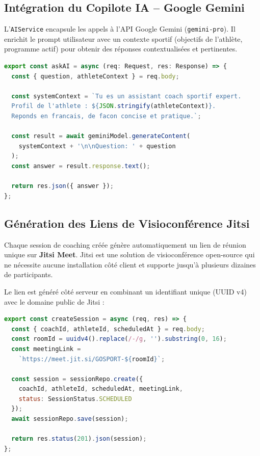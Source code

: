 \subsection{Intégration du Copilote IA -- Google Gemini}
L'\texttt{AIService} encapsule les appels à l'API Google Gemini (\texttt{gemini-pro}). Il enrichit le prompt utilisateur avec un contexte sportif (objectifs de l'athlète, programme actif) pour obtenir des réponses contextualisées et pertinentes.

\begin{lstlisting}[language=JavaScript,
    caption=Extrait AIController.ts -- Appel à l'API Gemini]
export const askAI = async (req: Request, res: Response) => {
  const { question, athleteContext } = req.body;

  const systemContext = `Tu es un assistant coach sportif expert.
  Profil de l'athlete : ${JSON.stringify(athleteContext)}.
  Reponds en francais, de facon concise et pratique.`;

  const result = await geminiModel.generateContent(
    systemContext + '\n\nQuestion: ' + question
  );
  const answer = result.response.text();

  return res.json({ answer });
};
\end{lstlisting}

\subsection{Génération des Liens de Visioconférence Jitsi}
Chaque session de coaching créée génère automatiquement un lien de réunion unique sur \textbf{Jitsi Meet}. Jitsi est une solution de visioconférence open-source qui ne nécessite aucune installation côté client et supporte jusqu'à plusieurs dizaines de participants.

Le lien est généré côté serveur en combinant un identifiant unique (UUID v4) avec le domaine public de Jitsi :

\begin{lstlisting}[language=JavaScript,
    caption=Génération du lien Jitsi dans SessionController.ts]
export const createSession = async (req, res) => {
  const { coachId, athleteId, scheduledAt } = req.body;
  const roomId = uuidv4().replace(/-/g, '').substring(0, 16);
  const meetingLink =
    `https://meet.jit.si/GOSPORT-${roomId}`;

  const session = sessionRepo.create({
    coachId, athleteId, scheduledAt, meetingLink,
    status: SessionStatus.SCHEDULED
  });
  await sessionRepo.save(session);

  return res.status(201).json(session);
};
\end{lstlisting}

